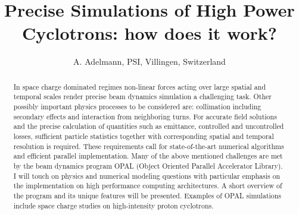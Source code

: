 \documentclass{JAC2003}
\begin{document}
\title{Precise Simulations of High Power Cyclotrons: how does it work?}

\author{A. Adelmann, PSI, Villingen, Switzerland}

\maketitle

\begin{abstract}
In space charge dominated regimes non-linear forces acting over large spatial and temporal scales render precise beam dynamics simulation a challenging task. Other possibly important physics processes to be considered are: collimation including secondary effects and interaction from neighboring turns. For accurate field solutions and the precise calculation of quantities such as emittance, controlled and uncontrolled losses, sufficient particle statistics together with corresponding spatial and temporal resolution is required. These requirements call for state-of-the-art numerical algorithms and efficient parallel implementation. Many of the above mentioned challenges are met by the beam dynamics program OPAL (Object Oriented Parallel Accelerator Library). I will touch on physics and numerical modeling questions with particular emphasis on the implementation on high performance computing architectures. A short overview of the program and its unique features will be presented. Examples of OPAL simulations include space charge studies on high-intensity proton cyclotrons.
\end{abstract}
\end{document}
